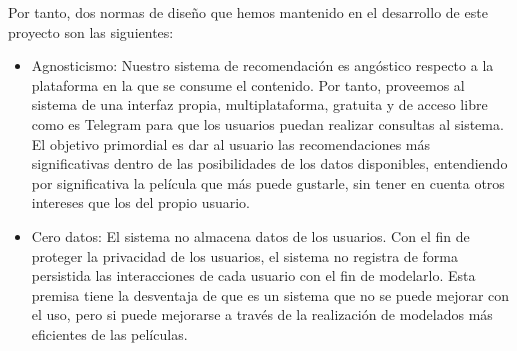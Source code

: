 Por tanto, dos normas de diseño que hemos mantenido en el desarrollo de este proyecto son las siguientes:

\begin{itemize}
    \item Agnosticismo: Nuestro sistema de recomendación es angóstico respecto a la plataforma en la que se consume el contenido. Por tanto, proveemos al sistema de una interfaz propia, multiplataforma, gratuita y de acceso libre como es Telegram para que los usuarios puedan realizar consultas al sistema. El objetivo primordial es dar al usuario las recomendaciones más significativas dentro de las posibilidades de los datos disponibles, entendiendo por significativa la película que más puede gustarle, sin tener en cuenta otros intereses que los del propio usuario.
    \item Cero datos: El sistema no almacena datos de los usuarios. Con el fin de proteger la privacidad de los usuarios, el sistema no registra de forma persistida las interacciones de cada usuario con el fin de modelarlo. Esta premisa tiene la desventaja de que es un sistema que no se puede mejorar con el uso, pero si puede mejorarse a través de la realización de modelados más eficientes de las películas.
\end{itemize}



